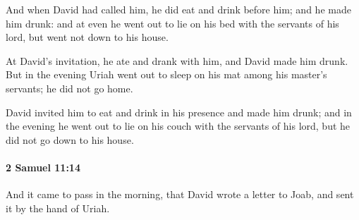 			\begin{versebox}
					\item[BHS] 
					\item[ASV] And when David had called him, he did eat and drink before him; and he made him drunk: and at even he went out to lie on his bed with the servants of his lord, but went not down to his house.
					\item[NIV] At David’s invitation, he ate and drank with him, and David made him drunk. But in the evening Uriah went out to sleep on his mat among his master’s servants; he did not go home.
					\item[NRSV] David invited him to eat and drink in his presence and made him drunk; and in the evening he went out to lie on his couch with the servants of his lord, but he did not go down to his house.
			\end{versebox}

		\paragraph{2 Samuel 11:14} %
			\label{2SAMUEL-11-14}

			And it came to pass in the morning, that David wrote a letter to Joab, and sent it by the hand of Uriah.

